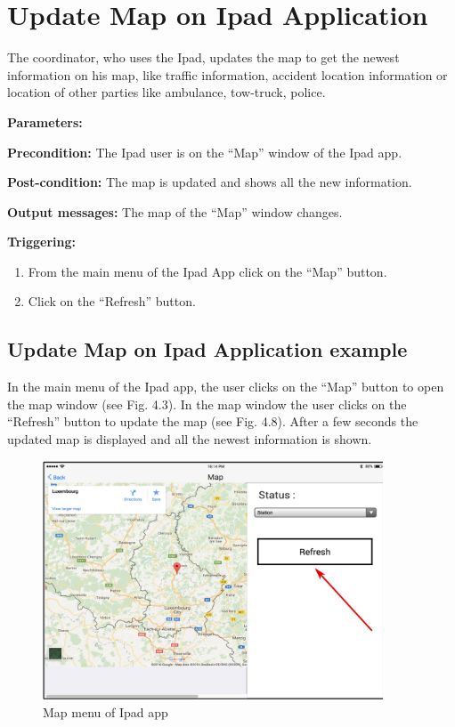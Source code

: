 \section{Update Map on Ipad Application}
\label{operation:MyOperation}
The coordinator, who uses the Ipad, updates the map to get the newest
information on his map, like traffic information, accident location information or location
of other parties like ambulance, tow-truck, police.

\begin{description}

\item \textbf{Parameters:} 
\item \textbf{Precondition:} The Ipad user is on the “Map” window of
the Ipad app.
\item \textbf{Post-condition:} The map is updated and shows all the new
information.
\item \textbf{Output messages:} The map of the “Map” window changes.


\item \textbf{Triggering:}
\begin{enumerate}
  \item From the main menu of the Ipad App click on the “Map” button.
  \item Click on the “Refresh” button.
\end{enumerate}
 

\end{description}

 
\subsection{Update Map on Ipad Application example}
In the main menu of the Ipad app, the user clicks on the “Map” button to open
the map window (see Fig. 4.3). In the map window the user clicks on the
“Refresh” button to update the map (see Fig. 4.8). After a few seconds the
updated map is displayed and all the newest information is shown.

\begin{minipage}{1.0\textwidth}
\begin{figure}[H]
\caption{Map menu of Ipad app}
\includegraphics[width=0.9\textwidth]{UpdateMap.eps}
\end{figure}
\end{minipage}
